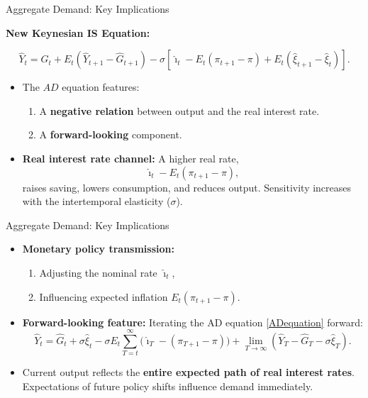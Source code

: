 \documentclass[11pt,aspectratio=169]{beamer}
\begin{document}
\begin{frame}[label=ADFeatures]{Aggregate Demand: Key Implications}
\small

\textbf{New Keynesian IS Equation:}

\[
\hat{Y}_t
=
\hat{G}_t
+
E_t(\hat{Y}_{t+1}-\hat{G}_{t+1})
-
\sigma\left[
\hat{\imath}_t - E_t(\pi_{t+1}-\pi)
+ E_t(\hat{\xi}_{t+1}-\hat{\xi}_t)
\right].
\label{ADequation1}
\]

\begin{itemize}
    \item The $AD$ equation features:
    \begin{enumerate}
        \item A \textbf{negative relation} between output and the real interest rate.
        \item A \textbf{forward-looking} component.
    \end{enumerate}

    \item \textbf{Real interest rate channel:}  
    A higher real rate,
    \[
    \hat{\imath}_t - E_t(\pi_{t+1}-\pi),
    \]
    raises saving, lowers consumption, and reduces output.  
    Sensitivity increases with the intertemporal elasticity ($\sigma$).
\end{itemize}

\end{frame}

\begin{frame}[label=ADFeatures]{Aggregate Demand: Key Implications}
\small

\begin{itemize}

    \item \textbf{Monetary policy transmission:}
    \begin{enumerate}
        \item Adjusting the nominal rate $\hat{\imath}_t$,
        \item Influencing expected inflation $E_t(\pi_{t+1}-\pi)$.
    \end{enumerate}

    \item \textbf{Forward-looking feature:}  
    Iterating the AD equation \eqref{ADequation} forward:
    \[
    \hat{Y}_t
    =
    \hat{G}_t + \sigma \hat{\xi}_t
    - \sigma E_t \sum_{T=t}^{\infty}
      \big(\hat{\imath}_T - (\pi_{T+1}-\pi)\big)
    + \lim_{T\to\infty}(\hat{Y}_T - \hat{G}_T - \sigma \hat{\xi}_T).
    \]

    \item Current output reflects the \textbf{entire expected path of real interest rates}.  
          Expectations of future policy shifts influence demand immediately.
\end{itemize}

\end{frame}
\end{document}
